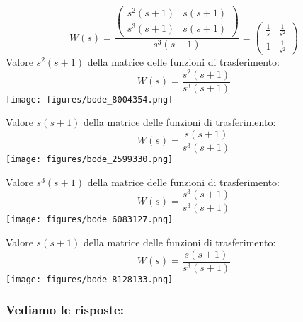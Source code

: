 \documentclass{article}
\begin{document}
\[ W(s)  =  \frac{\left(\begin{matrix}s^{2} \left(s + 1\right) & s \left(s + 1\right)\\s^{3} \left(s + 1\right) & s \left(s + 1\right)\end{matrix}\right)}{s^{3} \left(s + 1\right)} = \left(\begin{matrix}\frac{1}{s} & \frac{1}{s^{2}}\\1 & \frac{1}{s^{2}}\end{matrix}\right)  \] 
Valore $ s^{2} \left(s + 1\right) $ della matrice delle funzioni di trasferimento:
\[ W(s) = \frac{s^{2} \left(s + 1\right)}{s^{3} \left(s + 1\right)} \]\texttt{[image: figures/bode\_8004354.png]}


Valore $ s \left(s + 1\right) $ della matrice delle funzioni di trasferimento:
\[ W(s) = \frac{s \left(s + 1\right)}{s^{3} \left(s + 1\right)} \]\texttt{[image: figures/bode\_2599330.png]}


Valore $ s^{3} \left(s + 1\right) $ della matrice delle funzioni di trasferimento:
\[ W(s) = \frac{s^{3} \left(s + 1\right)}{s^{3} \left(s + 1\right)} \]\texttt{[image: figures/bode\_6083127.png]}


Valore $ s \left(s + 1\right) $ della matrice delle funzioni di trasferimento:
\[ W(s) = \frac{s \left(s + 1\right)}{s^{3} \left(s + 1\right)} \]\texttt{[image: figures/bode\_8128133.png]}


\subsubsection{Vediamo le risposte:} 
\end{document}
